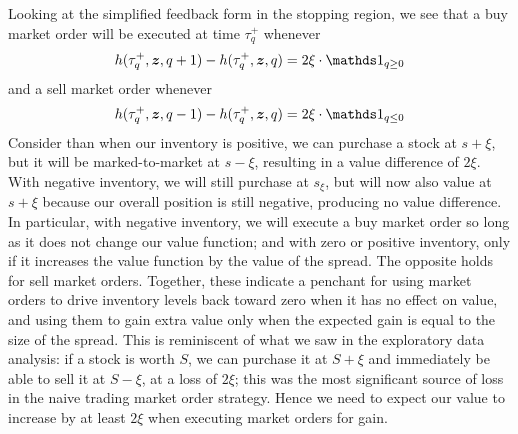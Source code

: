 Looking at the simplified feedback form in the stopping region, we see that a buy market order will be executed at time $\tau^+_q$ whenever
\begin{equation}\label{eq:buyMOfeedbackcase1}
h(\tau^+_q, \bz, q+1) - h(\tau^+_q,\bz,q) = 2 \xi \cdot \indicator_{q \geq 0}
\end{equation}
and a sell market order whenever
\begin{equation}\label{eq:sellMOfeedbackcase1}
h(\tau^+_q, \bz, q-1) - h(\tau^+_q,\bz,q) = 2 \xi \cdot \indicator_{q \leq 0}
\end{equation}
Consider than when our inventory is positive, we can purchase a stock at $s+\xi$, but it will be marked-to-market at $s-\xi$, resulting in a value difference of $2\xi$. With negative inventory, we will still purchase at $s_\xi$, but will now also value at $s+\xi$ because our overall position is still negative, producing no value difference. In particular, with negative inventory, we will execute a buy market order so long as it does not change our value function; and with zero or positive inventory, only if it increases the value function by the value of the spread. The opposite holds for sell market orders. Together, these indicate a penchant for using market orders to drive inventory levels back toward zero when it has no effect on value, and using them to gain extra value only when the expected gain is equal to the size of the spread. This is reminiscent of what we saw in the exploratory data analysis: if a stock is worth $S$, we can purchase it at $S+\xi$ and immediately be able to sell it at $S-\xi$, at a loss of $2 \xi$; this was the most significant source of loss in the naive trading market order strategy. Hence we need to expect our value to increase by at least $2\xi$ when executing market orders for gain.

